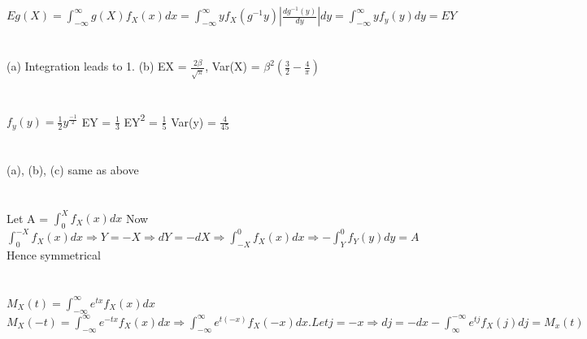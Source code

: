 \documentclass{report}
\begin{document}
\section{}
{$Eg(X) = {\int_{-\infty}^{\infty}g(X)f_{X}(x)dx = {\int_{-\infty}^{\infty}yf_{X}(g^{-1}{y})|\frac{dg^{-1}(y)}{dy}|dy = \int_{-\infty}^{\infty}yf_{y}(y)dy = EY}}$}
{\newline}

\section{}
(a) Integration leads to 1.
{\newline}
(b) EX = {$\frac{2\beta}{\sqrt{\pi}}$}, Var(X) = {$\beta^{2}(\frac{3}{2} - \frac{4}{\pi})$}
{\newline}

\section{}
{$f_{y}(y) = \frac{1}{2}y^{\frac{-1}{2}}$}
{\newline}
EY = {$\frac{1}{3}$}
{\newline}
EY{\textsuperscript{2}} = $\frac{1}{5}$
{\newline}
Var(y) = $\frac{4}{45}$
{\newline}

\section{}
(a), (b), (c) same as above
{\newline}

\section{}
Let A = {$\int_{0}^{X}f_{X}(x)dx$}
Now {$\int_{0}^{-X}f_{X}(x)dx \Rightarrow Y = -X \Rightarrow dY = -dX \Rightarrow \int_{-X}^{0}f_{X}(x)dx \Rightarrow -\int_{Y}^{0}f_{Y}(y)dy = A$}
{\newline}
Hence symmetrical
{\newline}

\section{}
{$M_{X}(t) = \int_{-\infty}^{\infty}e^{tx}f_{X}(x)dx$}
{\newline}
{$M_{X}(-t) = \int_{-\infty}^{\infty}e^{-tx}f_{X}(x)dx \Rightarrow \int_{-\infty}^{\infty}e^{t(-x)}f_{X}(-x)dx. Let j = -x {\Rightarrow} dj = -dx -\int_{\infty}^{-\infty}e^{tj}f_{X}(j)dj = M_{x}(t)$}
{\newline}
\end{document}
